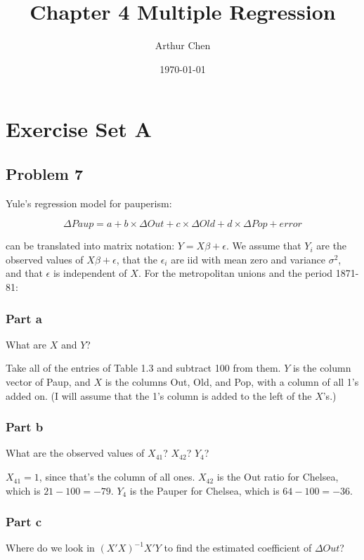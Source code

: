 \documentclass{article}
\author{Arthur Chen}
\title{Chapter 4 Multiple Regression}
\date{\today}
\begin{document}
\maketitle

\section*{Exercise Set A}

\subsection*{Problem 7}

Yule's regression model for pauperism:

\[
\Delta Paup = a + b \times \Delta Out + c \times \Delta Old + d \times \Delta Pop + error
\]

can be translated into matrix notation: $Y = X\beta + \epsilon$. We assume that $Y_i$ are the observed values of $X\beta + \epsilon$, that the $\epsilon_i$ are iid with mean zero and variance $\sigma^2$, and that $\epsilon$ is independent of $X$. For the metropolitan unions and the period 1871-81:

\subsubsection*{Part a}

What are $X$ and $Y$?

Take all of the entries of Table 1.3 and subtract 100 from them. $Y$ is the column vector of Paup, and $X$ is the columns Out, Old, and Pop, with a column of all 1's added on. (I will assume that the 1's column is added to the left of the $X$'s.)

\subsubsection*{Part b}

What are the observed values of $X_{41}$? $X_{42}$? $Y_4$?

$X_{41} = 1$, since that's the column of all ones. $X_{42}$ is the Out ratio for Chelsea, which is $21-100 = -79$. $Y_4$ is the Pauper for Chelsea, which is $64-100 = -36$.

\subsubsection*{Part c}

Where do we look in $(X'X)^{-1}X'Y$ to find the estimated coefficient of $\Delta Out$?
\end{document}
